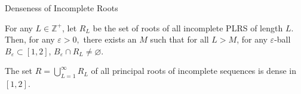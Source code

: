 \documentclass[handout]{beamer}
\newcommand{\Z}{\mathbb{Z}}
\begin{document}
\begin{frame}{Denseness of Incomplete Roots}
	\begin{theorem}[SMALL 2020]
	For any $L\in \Z ^{+}$, let $R_{L}$ be the set of roots of all incomplete PLRS of length $L$. Then, for any $\varepsilon >0,$ there exists an $M$ such that for all $L>M$, for any $\varepsilon $-ball $B_{\varepsilon }\subset [ 1,2 ]$, $B_{\varepsilon }\cap R_{L}\neq \varnothing.$
\end{theorem}
\pause
\bigskip
\begin{corollary}
	The set $R=\bigcup _{L=1}^{\infty }R_{L}$ of all principal roots of incomplete sequences is dense in $[1,2]$.
\end{corollary} 

\end{frame}


\end{document}
